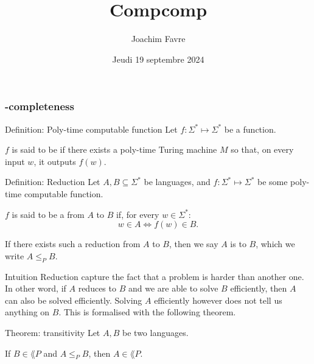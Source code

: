 \documentclass[a4paper]{article}
\title{Compcomp}
\author{Joachim Favre}
\date{Jeudi 19 septembre 2024}
\begin{document}
\maketitle


\subsubsection{-completeness}

\begin{parag}{Definition: Poly-time computable function}
    Let $f: \Sigma^* \mapsto \Sigma^*$ be a function.

    $f$ is said to be  if there exists a poly-time Turing machine $M$ so that, on every input $w$, it outputs $f\left(w\right)$.
\end{parag}

\begin{parag}{Definition: Reduction}
    Let $A, B \subseteq \Sigma^*$ be languages, and $f: \Sigma^* \mapsto \Sigma^*$ be some poly-time computable function.

    $f$ is said to be a  from $A$ to $B$ if, for every $w \in \Sigma^*$: 
    \[w \in A \iff f\left(w\right) \in B.\]
    
    If there exists such a reduction from $A$ to $B$, then we say $A$ is  to $B$, which we write $A \leq_P B$.

    \begin{subparag}{Intuition}
        Reduction capture the fact that a problem is harder than another one. In other word, if $A$ reduces to $B$ and we are able to solve $B$ efficiently, then $A$ can also be solved efficiently. Solving $A$ efficiently however does not tell us anything on $B$. This is formalised with the following theorem.
    \end{subparag}
\end{parag}

\begin{parag}{Theorem:  transitivity}
    Let $A, B$ be two languages.

    If $B \in \lang{P}$ and $A \leq_P B$, then $A \in \lang{P}$. 
\end{parag}
\end{document}
